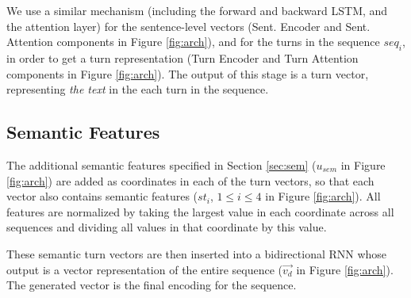 We use a similar mechanism (including the forward and backward 
LSTM, and the attention layer) for the sentence-level vectors (Sent. Encoder and Sent. Attention components in Figure \ref{fig:arch}), 
and for the turns in the sequence $seq_i$, in order to get a turn representation 
(Turn Encoder and Turn Attention components in Figure \ref{fig:arch}). 
The output of this stage is a turn vector, representing {\em the text} in the each turn in the sequence. 

\subsection{Semantic Features}
The additional semantic features specified 
in Section \ref{sec:sem} ($u_{sem}$ in Figure \ref{fig:arch})
are added as coordinates in each of the turn vectors, 
so that each vector also contains semantic features  ($st_i$, $1\leq i \leq 4$ in Figure \ref{fig:arch}). 
All features are normalized by taking the largest 
value in each coordinate across all sequences and dividing 
all values in that coordinate by this value. 

These semantic turn vectors are then inserted into a bidirectional RNN whose output 
is a vector representation of the entire sequence ($\vec{v_d}$ in Figure \ref{fig:arch}). 
The generated vector is the final encoding for the sequence.








